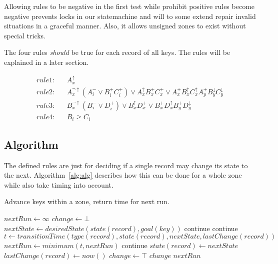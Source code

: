 \documentclass[twoside, a4paper]{article}
\begin{document}
Allowing rules to be negative in the first test while prohibit positive
rules become negative prevents locks in our statemachine and will to
some extend repair invalid situations in a graceful manner. Also, it 
allows unsigned zones to exist without special tricks.

The four rules \emph{should} be true for each record of all keys. The 
rules will be explained in a later section.

\begin{eqnarray}
\label{eqn:rule1}
rule1:	&& A_{x}^{\uparrow} \\
\label{eqn:rule2}
rule2:	&& A_{x}^{\neg \uparrow} (A_{i}^{-} \vee B_{i}^{+} C_{i}^{+}) \vee A_{x}^{\uparrow}
	B_{x}^{+} C_{x}^{+} \vee A_{x}^{+} B_{x}^{\uparrow} C_{x}^{\uparrow}
	A_{y}^{+} B_{y}^{\downarrow} C_{y}^{\downarrow}\\
\label{eqn:rule3}
rule3:	&& B_{x}^{\neg \uparrow} (B_{i}^{-} \vee D_{i}^{+}) \vee B_{x}^{\uparrow}
	D_{x}^{+} \vee B_{x}^{+} D_{x}^{\uparrow} B_{y}^{+}
	D_{y}^{\downarrow} \\
\label{eqn:rule4}
rule4: && B_{i} \geq C_{i}
\end{eqnarray}

\subsection{Algorithm}

The defined rules are just for deciding if a single record may change its
state to the next. Algorithm~\ref{alg:alg} describes how this can be 
done for a whole zone while also take timing into account. 

\begin{algorithm}
\caption{Advance keys within a zone, return time for next run.}
\label{alg:alg}
\begin{algorithmic}
\STATE $nextRun \gets \infty$
\REPEAT
\STATE $change \gets \bot$ 
\STATE $nextState \gets desiredState(state(record), goal(key))$
\STATE {}
\STATE continue
\ENDIF
{}
\STATE {}
\STATE continue
\ENDIF
\STATE $t \gets transitionTime(type(record), state(record), nextState, lastChange(record))$
\STATE {}
\STATE $nextRun \gets minimum(t, nextRun)$
\STATE continue
\ENDIF
\STATE $state(record) \gets nextState$
\STATE $lastChange(record) \gets now()$
\STATE $change \gets \top$
\ENDFOR
\ENDFOR
\UNTIL \NOT $change$
\RETURN $nextRun$
\end{algorithmic}
\end{algorithm}
\end{document}
